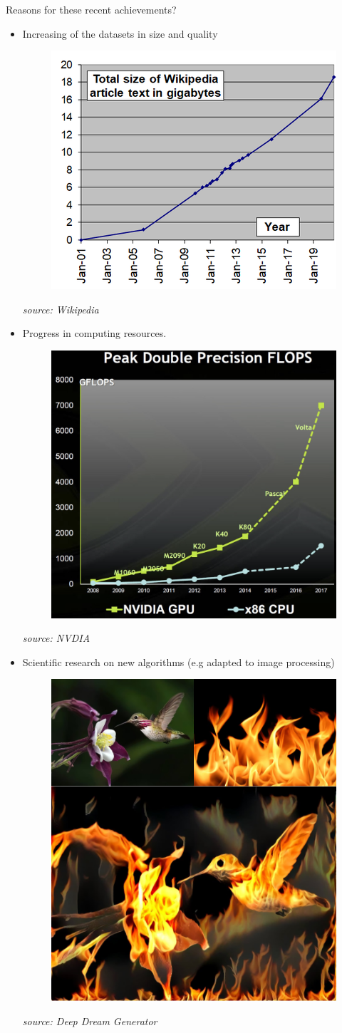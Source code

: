 \documentclass[handout, 10pt]{beamer}
\newcommand{\rref}[1][]{\hfill{\scriptsize\textit{#1}}}
\begin{document}
\begin{frame}[t]{Reasons for these recent achievements?}
    \begin{itemize}
        \item Increasing of the datasets in size and quality
         {
        \begin{figure}
\includegraphics[width=.6\textwidth]{fig/L1/Wikipedia_article_size_in_gigabytes.png}
\end{figure}
\rref[source: Wikipedia]
}
        \item <2-> Progress in computing resources.
         {
        \begin{figure}
\includegraphics[width=.6\textwidth]{fig/L1/evolution-gpu.png}
\end{figure}
\rref[source: NVDIA]
}        
        
        \item <3-> Scientific research on new algorithms (e.g adapted to image processing)
                 {
        \begin{figure}
\includegraphics[width=.4\textwidth]{fig/L1/deep-art.jpg}
\end{figure}
\rref[source: Deep Dream Generator]

}
\end{itemize}
\end{frame}
\end{document}
